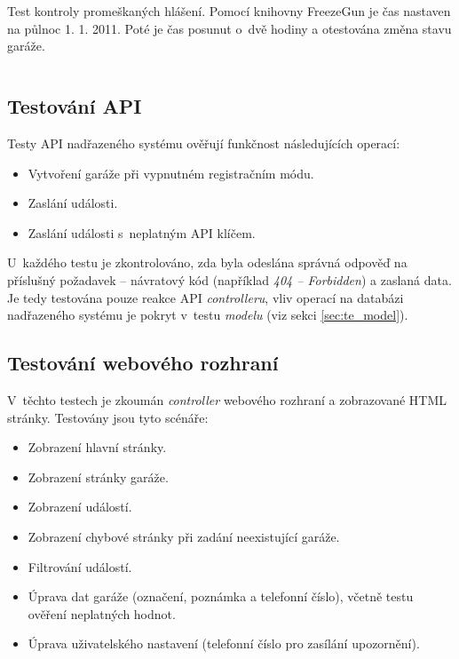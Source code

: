 \begin{listing}[htbp]
\caption{\label{lst:freezegun} Test kontroly promeškaných hlášení. Pomocí knihovny FreezeGun je čas nastaven na půlnoc 1. 1. 2011. Poté je čas posunut o~dvě hodiny a otestována změna stavu garáže.}
\inputminted[bgcolor=codebg]{python}{source-samples/freezegun.py}
\end{listing}

\subsection{Testování API}

Testy API nadřazeného systému ověřují funkčnost následujících operací:

\begin{itemize}
    \item Vytvoření garáže při vypnutném registračním módu.
    \item Zaslání události.
    \item Zaslání události s~neplatným API klíčem.
\end{itemize}

U~každého testu je zkontrolováno, zda byla odeslána správná odpověď na příslušný požadavek -- návratový kód (například \textit{404 -- Forbidden}) a zaslaná data. Je tedy testována pouze reakce API \textit{controlleru}, vliv operací na databázi nadřazeného systému je pokryt v~testu \textit{modelu} (viz sekci \ref{sec:te_model}).

\subsection{Testování webového rozhraní}

V~těchto testech je zkoumán \textit{controller} webového rozhraní a zobrazované HTML stránky. Testovány jsou tyto scénáře:

\begin{itemize}
    \item Zobrazení hlavní stránky.
    \item Zobrazení stránky garáže.
    \item Zobrazení událostí.
    \item Zobrazení chybové stránky při zadání neexistující garáže.
    \item Filtrování událostí.
    \item Úprava dat garáže (označení, poznámka a telefonní číslo), včetně testu ověření neplatných hodnot.
    \item Úprava uživatelského nastavení (telefonní číslo pro zasílání upozornění).
\end{itemize}

